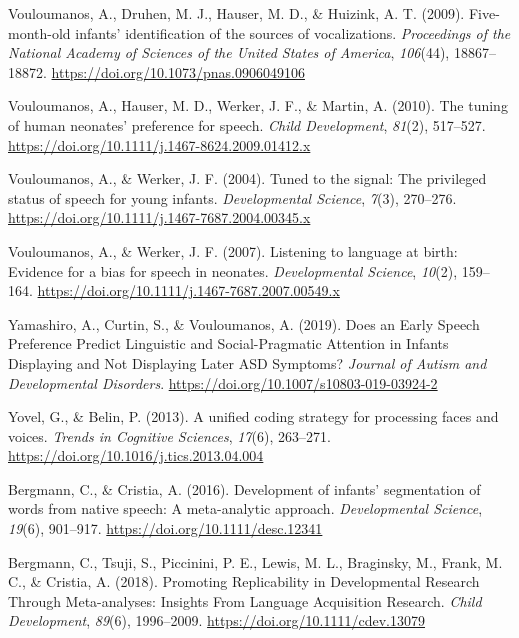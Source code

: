 \documentclass[man]{apa6}
\begin{document}
\leavevmode\hypertarget{ref-vouloumanos_five-month-old_2009}{}%
Vouloumanos, A., Druhen, M. J., Hauser, M. D., \& Huizink, A. T. (2009). Five-month-old infants' identification of the sources of vocalizations. \emph{Proceedings of the National Academy of Sciences of the United States of America}, \emph{106}(44), 18867--18872. \url{https://doi.org/10.1073/pnas.0906049106}

\leavevmode\hypertarget{ref-vouloumanos_tuning_2010}{}%
Vouloumanos, A., Hauser, M. D., Werker, J. F., \& Martin, A. (2010). The tuning of human neonates' preference for speech. \emph{Child Development}, \emph{81}(2), 517--527. \url{https://doi.org/10.1111/j.1467-8624.2009.01412.x}

\leavevmode\hypertarget{ref-vouloumanos_tuned_2004}{}%
Vouloumanos, A., \& Werker, J. F. (2004). Tuned to the signal: The privileged status of speech for young infants. \emph{Developmental Science}, \emph{7}(3), 270--276. \url{https://doi.org/10.1111/j.1467-7687.2004.00345.x}

\leavevmode\hypertarget{ref-vouloumanos_listening_2007}{}%
Vouloumanos, A., \& Werker, J. F. (2007). Listening to language at birth: Evidence for a bias for speech in neonates. \emph{Developmental Science}, \emph{10}(2), 159--164. \url{https://doi.org/10.1111/j.1467-7687.2007.00549.x}

\leavevmode\hypertarget{ref-yamashiro_does_2019}{}%
Yamashiro, A., Curtin, S., \& Vouloumanos, A. (2019). Does an Early Speech Preference Predict Linguistic and Social-Pragmatic Attention in Infants Displaying and Not Displaying Later ASD Symptoms? \emph{Journal of Autism and Developmental Disorders}. \url{https://doi.org/10.1007/s10803-019-03924-2}

\leavevmode\hypertarget{ref-yovel_unified_2013}{}%
Yovel, G., \& Belin, P. (2013). A unified coding strategy for processing faces and voices. \emph{Trends in Cognitive Sciences}, \emph{17}(6), 263--271. \url{https://doi.org/10.1016/j.tics.2013.04.004}

\leavevmode\hypertarget{ref-bergmann_development_2016}{}%
Bergmann, C., \& Cristia, A. (2016). Development of infants' segmentation of words from native speech: A meta-analytic approach. \emph{Developmental Science}, \emph{19}(6), 901--917. \url{https://doi.org/10.1111/desc.12341}

\leavevmode\hypertarget{ref-bergmann_promoting_2018}{}%
Bergmann, C., Tsuji, S., Piccinini, P. E., Lewis, M. L., Braginsky, M., Frank, M. C., \& Cristia, A. (2018). Promoting Replicability in Developmental Research Through Meta-analyses: Insights From Language Acquisition Research. \emph{Child Development}, \emph{89}(6), 1996--2009. \url{https://doi.org/10.1111/cdev.13079}
\end{document}
